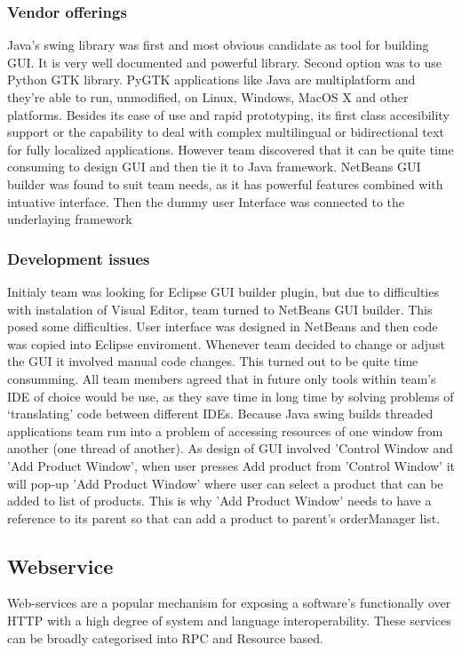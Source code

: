 \documentclass[pdftex,11pt,a4paper]{article}
\begin{document}
\subsubsection{Vendor offerings}
Java's swing library was first and most obvious candidate as tool for building GUI. It is very well documented and powerful library. Second option was to use  Python GTK library. PyGTK applications like Java are multiplatform and they're able to run, unmodified, on Linux, Windows, MacOS X and other platforms.
Besides its ease of use and rapid prototyping, its first class accesibility support or the capability to deal with complex multilingual or bidirectional text for fully localized applications. However team discovered that it can be quite time consuming to design GUI and then tie it to Java framework.
NetBeans GUI builder was found to suit team needs, as it has powerful features combined with intuative interface. Then the dummy user Interface was connected to the underlaying framework

\subsubsection{Development issues}
Initialy team was looking for Eclipse GUI builder plugin, but due to difficulties with instalation of Visual Editor, team turned to NetBeans GUI builder. This posed some difficulties. User interface was designed in NetBeans and then code was copied into Eclipse enviroment. Whenever team decided to change or adjust the GUI it involved manual code changes. This turned out to be quite time consumming. All team members agreed that in future only tools within team's IDE of choice would be use, as they save time in long time by solving problems of `translating' code between different IDEs.
Because Java swing builds threaded applications team run into a problem of accessing resources of one window from another (one thread of another). As design of GUI involved 'Control Window and 'Add Product Window', when user presses Add product from 'Control Window' it will pop-up 'Add Product Window' where user can select a product that can be added to list of products. This is why 'Add Product Window' needs to have a reference to its parent so that can add a product to parent's orderManager list.

\subsection{Webservice}

Web-services are a popular mechanism for exposing a software's functionally over HTTP with a high degree of system and language interoperability. These services can be broadly categorised into RPC and Resource based.
\end{document}
